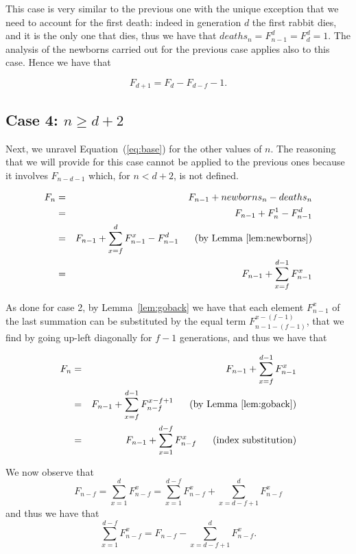 \documentclass[11pt,epsf]{article}
\begin{document}
This case is very similar to the previous one with the unique exception that we need to account for the first death:
indeed in generation $d$ the first rabbit dies, and it is the only one that dies, thus we have that $deaths_{n}=F_{n-1}^d=F_d^d=1$. The analysis of the newborns
carried out for the previous case applies also to this case. Hence we have that



\begin{equation}\label{eq:case3}
F_{d+1}=F_{d}-F_{d-f}-1.
\end{equation}


\subsection{Case 4:  $n\ge d+2$}

Next, we unravel Equation~(\ref{eq:base}) for the other values of $n$. The reasoning that we will provide
for this case cannot be applied to the previous ones because it involves $F_{n-d-1}$ which, for $n<d+2$,
is not defined.

\begin{eqnarray*}
F_n&=&F_{n-1}+newborns_n-deaths_n\\
      &=&F_{n-1}+F_n^1-F_{n-1}^d\\
      &=&F_{n-1}+\sum_{x=f}^{d} F_{n-1}^x-F_{n-1}^d\makebox{\ \ \ \ \ (by Lemma~\ref{lem:newborns})}\\
      &=&F_{n-1}+\sum_{x=f}^{d-1} F_{n-1}^x
\end{eqnarray*}

As done for case 2, by Lemma~\ref{lem:goback} we have that each element $F_{n-1}^x$ of the last summation can be
substituted by the equal term $F_{n-1-(f-1)}^{x-(f-1)}$, that we find by going up-left diagonally for $f-1$ generations,
and thus we have that

\begin{eqnarray*}
F_n&=&F_{n-1}+\sum_{x=f}^{d-1} F_{n-1}^x\\
      &=&F_{n-1}+\sum_{x=f}^{d-1} F_{n-f}^{x-f+1}\makebox{\ \ \ \ \ (by Lemma~\ref{lem:goback})}\\
      &=&F_{n-1}+\sum_{x=1}^{d-f} F_{n-f}^{x}\makebox{\ \ \ \ \ (index substitution)}\\
\end{eqnarray*}

We now observe that 
$$F_{n-f} = \sum_{x=1}^{d} F_{n-f}^x = \sum_{x=1}^{d-f} F_{n-f}^x+\sum_{x=d-f+1}^{d} F_{n-f}^x$$
and thus we have that
$$\sum_{x=1}^{d-f} F_{n-f}^x = F_{n-f} - \sum_{x=d-f+1}^{d} F_{n-f}^x.$$
\end{document}
